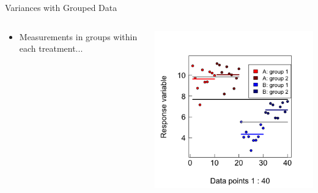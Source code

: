 \documentclass{beamer}
\begin{document}
\begin{frame}{Variances with Grouped Data}
  \begin{columns}[onlytextwidth] %
    \begin{column}{0.54\textwidth}
  \begin{itemize}
    \item Measurements in groups within each treatment...
  \end{itemize}    \end{column}
    \hspace{0.02\textwidth} %
    \begin{column}{0.46\textwidth}
      \begin{center}
        \includegraphics[width=0.999\textwidth]{lectures/day_1_intro_to_mems/figures/unnamed-chunk-24-1.png}
      \end{center}
    \end{column}
  \end{columns}
\end{frame}
\end{document}
